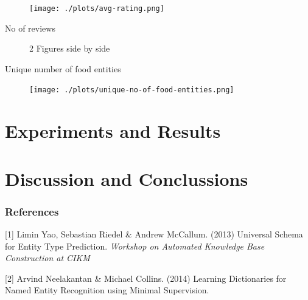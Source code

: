 \documentclass{article} %
\begin{document}
\begin{figure}[h]
  \begin{center}
    \texttt{[image: ./plots/avg-rating.png]}
    \label{fig:}
    \caption{}
  \end{center}
\end{figure}


No of reviews 

\begin{figure}[h]
    \centering
    \qquad
    \caption{2 Figures side by side}%
    \label{fig:example}%
\end{figure}


Unique number of food entities

\begin{figure}[h]
  \begin{center}
    \texttt{[image: ./plots/unique-no-of-food-entities.png]}
    \label{fig:}
    \caption{}
  \end{center}
\end{figure}




\section{Experiments and Results}
\section{Discussion and Conclussions}

\subsubsection*{References}


\small{
[1] Limin Yao, Sebastian Riedel \& Andrew McCallum. (2013) 
Universal Schema for Entity Type Prediction. 
{\it Workshop on Automated Knowledge Base Construction at CIKM }

[2] Arvind Neelakantan \& Michael Collins. (2014)
Learning Dictionaries for Named Entity Recognition using Minimal Supervision. 
}
\end{document}
